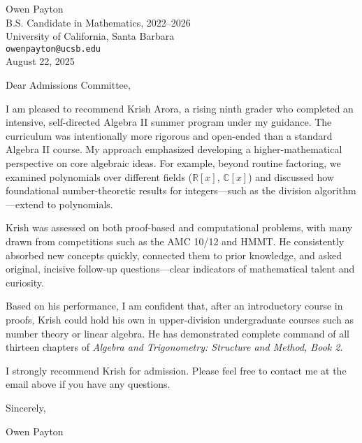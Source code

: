 \documentclass[11pt]{article}
\begin{document}
Owen Payton \\
B.S. Candidate in Mathematics, 2022--2026 \\
University of California, Santa Barbara \\
\texttt{owenpayton@ucsb.edu} \\
August 22, 2025

\vspace{1em}

Dear Admissions Committee,

I am pleased to recommend Krish Arora, a rising ninth grader who completed an intensive, self-directed Algebra II summer program under my guidance. The curriculum was intentionally more rigorous and open-ended than a standard Algebra II course. My approach emphasized developing a higher-mathematical perspective on core algebraic ideas. For example, beyond routine factoring, we examined polynomials over different fields ($\mathbb{R}[x]$, $\mathbb{C}[x]$) and discussed how foundational number-theoretic results for integers---such as the division algorithm---extend to polynomials.

Krish was assessed on both proof-based and computational problems, with many drawn from competitions such as the AMC 10/12 and HMMT. He consistently absorbed new concepts quickly, connected them to prior knowledge, and asked original, incisive follow-up questions---clear indicators of mathematical talent and curiosity.

Based on his performance, I am confident that, after an introductory course in proofs, Krish could hold his own in upper-division undergraduate courses such as number theory or linear algebra. He has demonstrated complete command of all thirteen chapters of \textit{Algebra and Trigonometry: Structure and Method, Book 2}.

I strongly recommend Krish for admission. Please feel free to contact me at the email above if you have any questions.

Sincerely,

Owen Payton
\end{document}
